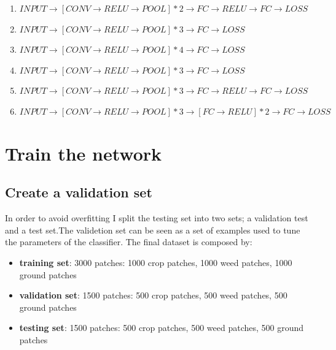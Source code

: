 \documentclass[]{report}
\begin{document}
\begin{enumerate}

\item $ INPUT \rightarrow [CONV \rightarrow RELU \rightarrow POOL]*2 \rightarrow FC \rightarrow RELU \rightarrow FC \rightarrow LOSS $ 

\item $ INPUT \rightarrow [CONV \rightarrow RELU \rightarrow POOL]*3 \rightarrow FC \rightarrow LOSS $ 

\item $ INPUT \rightarrow [CONV \rightarrow RELU \rightarrow POOL]*4 \rightarrow FC \rightarrow LOSS $ 

\item $ INPUT \rightarrow [CONV \rightarrow RELU \rightarrow POOL]*3 \rightarrow FC \rightarrow LOSS $ 

\item $ INPUT \rightarrow [CONV \rightarrow RELU \rightarrow POOL]*3 \rightarrow FC \rightarrow RELU \rightarrow FC \rightarrow LOSS $ 

\item $ INPUT \rightarrow [CONV \rightarrow RELU \rightarrow POOL]*3 \rightarrow [FC \rightarrow RELU]*2 \rightarrow FC \rightarrow LOSS $ 

\end{enumerate}


\section{Train the network}

\subsection{Create a validation set}

In order to avoid overfitting I split the testing set into two sets; a validation test and a test set.The validetion set can be seen as a set of examples used to tune the parameters of the classifier. The final dataset is composed by:

\begin{itemize}

	\item \textbf{training set}: 3000 patches: 1000 crop patches, 1000 weed patches, 1000 ground patches
	\item \textbf{validation set}: 1500 patches: 500 crop patches, 500 weed patches, 500 ground patches
	\item \textbf{testing set}: 1500 patches: 500 crop patches, 500 weed patches, 500 ground patches
	
\end{itemize}
\end{document}

